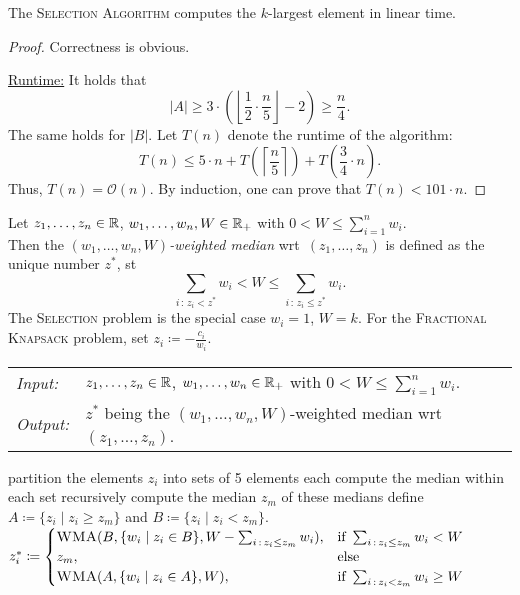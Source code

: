 \documentclass[../skript.tex]{subfiles}
\begin{document}
\vspace{-7pt}
\EndAlgorithmLine
\begin{theorem} %
The \textsc{Selection Algorithm} computes the $k$-largest element in linear time.
\end{theorem}
\begin{proof}
Correctness is obvious.

\underline{Runtime:} It holds that
\[
	|A| \geq 3 \cdot \left( \left\lfloor \frac{1}{2} \cdot \frac{n}{5} \right\rfloor - 2 \right) \geq \frac{n}{4}.
\]
The same holds for $|B|$.
Let $T(n)$ denote the runtime of the algorithm:
\[
	T(n) \leq 5 \cdot n + T \left( \left\lceil \frac{n}{5} \right\rceil \right) + T \left( \frac{3}{4} \cdot n \right).
\]
Thus, $T(n) = \mathcal{O}(n)$. By induction, one can prove that $T(n) < 101 \cdot n$.
\end{proof}
Let $z_1, \ldots, z_n \in \mathbb{R}$, $w_1, \ldots, w_n, W \in \mathbb{R}_+$ with $0 < W \leq \sum_{i=1}^n w_i$. \\
Then the \emph{$(w_1, \ldots, w_n, W)$-weighted median} \ac{wrt}\ $(z_1, \ldots, z_n)$ is defined as the unique number $z^*$, \ac{st}
\[
	\sum_{i \,:\, z_i < z^*} w_i < W \leq \sum_{i \,:\, z_i \leq z^*} w_i.
\]
The \textsc{Selection} problem is the special case $w_i = 1$, $W = k$.
For the \textsc{Fractional Knapsack} problem, set $z_i \coloneqq - \frac{c_i}{w_i}$.
\begin{samepage}
\begin{algorithmbox}
\begin{tabular}{@{}ll}
\textit{Input:} & $z_1, \ldots, z_n \in \mathbb{R}$, $w_1, \ldots, w_n \in \mathbb{R}_+$ with $0 < W \leq \sum_{i=1}^n w_i$. \\
\textit{Output:} & $z^*$ being the $(w_1, \ldots, w_n, W)$-weighted median \ac{wrt}\ $(z_1, \ldots, z_n)$.
\end{tabular}
\end{algorithmbox}
\vspace{-7pt}
\begin{algorithm}[H]
partition the elements $z_i$ into sets of 5 elements each\;
compute the median within each set\;
recursively compute the median $z_m$ of these medians\;
define $A \coloneqq \{ z_i \mid z_i \geq z_m \}$ and $B \coloneqq \{ z_i \mid z_i < z_m \}$.\;
$z_i^* \coloneqq \begin{cases}
\textsc{WMA}(B, \{ w_i \mid z_i \in B \}, W - \sum_{i \,:\, z_i \leq z_m} w_i), & \text{if } \sum_{i \,:\, z_i \leq z_m} w_i < W \\
z_m, & \text{else} \\
\textsc{WMA}(A, \{ w_i \mid z_i \in A \}, W), & \text{if } \sum_{i \,:\, z_i < z_m} w_i \geq W
\end{cases}$\;
\end{algorithm}
\vspace{-7pt}
\EndAlgorithmLine
\end{samepage}
\end{document}
